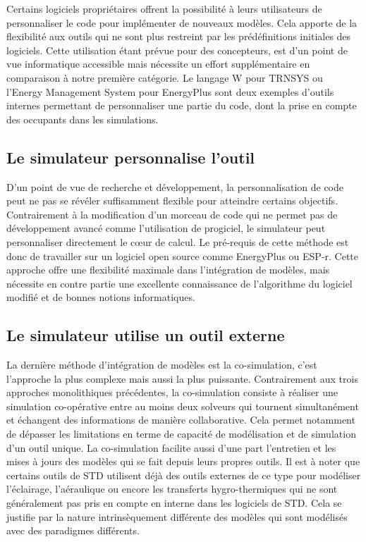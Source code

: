 Certains logiciels propriétaires offrent la possibilité à leurs utilisateurs de personnaliser le code pour implémenter de nouveaux modèles. Cela apporte de la flexibilité aux outils qui ne sont plus restreint par les prédéfinitions initiales des logiciels. Cette utilisation étant prévue pour des concepteurs, est d'un point de vue informatique accessible mais nécessite un effort supplémentaire en comparaison à notre première catégorie. Le langage W pour TRNSYS ou l'Energy Management System pour EnergyPlus sont deux exemples d'outils internes permettant de personnaliser une partie du code, dont la prise en compte des occupants dans les simulations.

\subsection{Le simulateur personnalise l'outil}

D'un point de vue de recherche et développement, la personnalisation de code peut ne pas se révéler suffisamment flexible pour atteindre certains objectifs. Contrairement à la modification d'un morceau de code qui ne permet pas de développement avancé comme l'utilisation de progiciel, le simulateur peut personnaliser directement le cœur de calcul. Le pré-requis de cette méthode est donc de travailler sur un logiciel open source comme EnergyPlus ou ESP-r. Cette approche offre une flexibilité maximale dans l'intégration de modèles, mais nécessite en contre partie une excellente connaissance de l'algorithme du logiciel modifié et de bonnes notions informatiques.

\subsection{Le simulateur utilise un outil externe}

La dernière méthode d'intégration de modèles est la co-simulation, c'est l'approche la plus complexe mais aussi la plus puissante. Contrairement aux trois approches monolithiques précédentes, la co-simulation consiste à réaliser une simulation co-opérative entre au moins deux solveurs qui tournent simultanément et échangent des informations de manière collaborative. Cela permet notamment de dépasser les limitations en terme de capacité de modélisation et de simulation d'un outil unique. La co-simulation facilite aussi d'une part l'entretien et les mises à jours des modèles qui se fait depuis leurs propres outils. Il est à noter que certains outils de STD utilisent déjà des outils externes de ce type pour modéliser l'éclairage, l'aéraulique ou encore les transferts hygro-thermiques qui ne sont généralement pas pris en compte en interne dans les logiciels de STD. Cela se justifie par la nature intrinsèquement différente des modèles qui sont modélisés avec des paradigmes différents.

